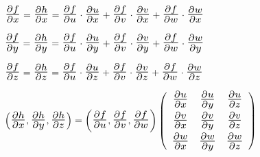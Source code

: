 \documentclass[10pt, titlepage]{article}
\newcommand{\bfrac}[2]{\scalebox{1.4}{$\frac{#1}{#2}$}}
\begin{document}
$\bfrac{\partial f}{\partial x} = \bfrac{\partial h}{\partial x} = \bfrac{\partial f}{\partial u} \cdot \bfrac{
\partial u}{\partial x} + \bfrac{\partial f}{\partial v} \cdot \bfrac{\partial v}{\partial x} + \bfrac{\partial f} 
{\partial w} \cdot \bfrac{\partial w}{\partial x}$
\vspace{3mm}

$\bfrac{\partial f}{\partial y} = \bfrac{\partial h}{\partial y} = \bfrac{\partial f}{\partial u} \cdot \bfrac{
\partial u}{\partial y} + \bfrac{\partial f}{\partial v} \cdot \bfrac{\partial v}{\partial y} + \bfrac{\partial f} 
{\partial w} \cdot \bfrac{\partial w}{\partial y}$
\vspace{3mm}

$\bfrac{\partial f}{\partial z} = \bfrac{\partial h}{\partial z} = \bfrac{\partial f}{\partial u} \cdot \bfrac{
\partial u}{\partial z} + \bfrac{\partial f}{\partial v} \cdot \bfrac{\partial v}{\partial z} + \bfrac{\partial f} 
{\partial w} \cdot \bfrac{\partial w}{\partial z}$
\vspace{5mm}

$\left ( \bfrac{\partial h}{\partial x}, \bfrac{\partial h}{\partial y}, \bfrac{\partial h}{\partial z} \right ) = 
\left ( \bfrac{\partial f}{\partial u}, \bfrac{\partial f}{\partial v}, \bfrac{\partial f}{\partial w} \right )
\left (\begin{array}{ccc}

\bfrac{\partial u}{\partial x} & \bfrac{\partial u}{\partial y} & \bfrac{\partial u}{\partial z}\vspace{1mm}\\
\bfrac{\partial v}{\partial x} & \bfrac{\partial v}{\partial y} & \bfrac{\partial v}{\partial z}\vspace{1mm}\\
\bfrac{\partial w}{\partial x} & \bfrac{\partial w}{\partial y} & \bfrac{\partial w}{\partial z}\\

\end{array} \right )
$
\end{document}

